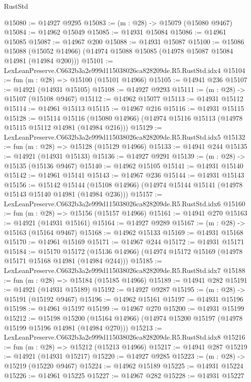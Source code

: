 \begin{lexlean}{RustStd}
\begin{coremodule}
@15080 := @14927 @9295
@15083 := (m : @28) -> @15079 (@15080 @9467)
@15084 := @14962 @15049
@15085 := @14931 @15084
@15086 := @14961 @15085
@15087 := @14967 @200
@15088 := @14931 @15087
@15100 := @15086
    @15088
    (@15052 @14966)
    (@14974 @15088 @15085 (@14978 @15087 @15084 @14981 (@14984 @200)))
@15101 := LexLeanPreserve.C6632b3a2e999d115038026ca828209de.R5.RustStd.idx4
@15104 := fun (m : @28) => @15100 (@15101 @14966)
@15105 := @14941 @236
@15107 := @14921 (@14931 @15105)
@15108 := @14927 @9293
@15111 := (m : @28) -> @15107 (@15108 @9467)
@15112 := @14962 @15077
@15113 := @14931 @15112
@15114 := @14961 @15113
@15115 := @14967 @216
@15116 := @14931 @15115
@15128 := @15114
    @15116
    (@15080 @14966)
    (@14974 @15116 @15113 (@14978 @15115 @15112 @14981 (@14984 @216)))
@15129 := LexLeanPreserve.C6632b3a2e999d115038026ca828209de.R5.RustStd.idx5
@15132 := fun (m : @28) => @15128 (@15129 @14966)
@15133 := @14941 @244
@15135 := @14921 (@14931 @15133)
@15136 := @14927 @9291
@15139 := (m : @28) -> @15135 (@15136 @9467)
@15140 := @14962 @15105
@15141 := @14931 @15140
@15142 := @14961 @15141
@15143 := @14967 @236
@15144 := @14931 @15143
@15156 := @15142
    @15144
    (@15108 @14966)
    (@14974 @15144 @15141 (@14978 @15143 @15140 @14981 (@14984 @236)))
@15157 := LexLeanPreserve.C6632b3a2e999d115038026ca828209de.R5.RustStd.idx6
@15160 := fun (m : @28) => @15156 (@15157 @14966)
@15161 := @14941 @270
@15163 := @14921 (@14931 @15161)
@15164 := @14927 @9289
@15167 := (m : @28) -> @15163 (@15164 @9467)
@15168 := @14962 @15133
@15169 := @14931 @15168
@15170 := @14961 @15169
@15171 := @14967 @244
@15172 := @14931 @15171
@15184 := @15170
    @15172
    (@15136 @14966)
    (@14974 @15172 @15169 (@14978 @15171 @15168 @14981 (@14984 @244)))
@15185 := LexLeanPreserve.C6632b3a2e999d115038026ca828209de.R5.RustStd.idx7
@15188 := fun (m : @28) => @15184 (@15185 @14966)
@15189 := @14941 @282
@15191 := @14921 (@14931 @15189)
@15192 := @14927 @9287
@15195 := (m : @28) -> @15191 (@15192 @9467)
@15196 := @14962 @15161
@15197 := @14931 @15196
@15198 := @14961 @15197
@15199 := @14967 @270
@15200 := @14931 @15199
@15212 := @15198
    @15200
    (@15164 @14966)
    (@14974 @15200 @15197 (@14978 @15199 @15196 @14981 (@14984 @270)))
@15213 := LexLeanPreserve.C6632b3a2e999d115038026ca828209de.R5.RustStd.idx8
@15216 := fun (m : @28) => @15212 (@15213 @14966)
@15217 := @14941 @287
@15219 := @14921 (@14931 @15217)
@15220 := @14927 @9285
@15223 := (m : @28) -> @15219 (@15220 @9467)
@15224 := @14962 @15189
@15225 := @14931 @15224
@15226 := @14961 @15225
@15227 := @14967 @282
@15228 := @14931 @15227

\end{coremodule}
\end{lexlean}
